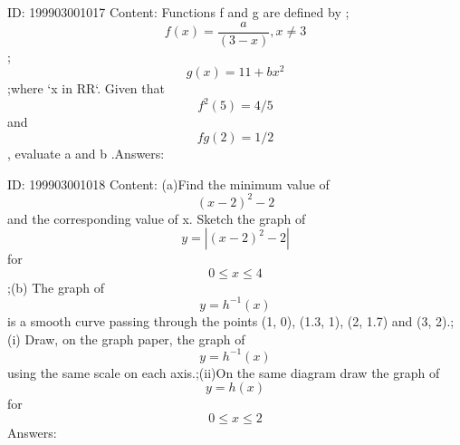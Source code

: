 \documentclass{article}
\begin{document}
ID: 199903001017
Content:
Functions f and g are defined by ;$$f(x)=\frac{a}{(3-x)}, x\neq3$$;$$g(x) = 11+bx^2$$;where `x in RR`. Given that $$f^2(5)=4/5$$ and $$fg(2)=1/2$$, evaluate a and b .Answers:

ID: 199903001018
Content:
(a)Find the minimum value of \[(x-2)^2-2\] and the corresponding value of x. Sketch the graph of \[y=|(x-2)^2-2|\] for \[0\leq x\leq 4\];(b) The graph of \[y=h^{-1}(x)\] is a smooth curve passing through the points (1, 0), (1.3, 1), (2, 1.7) and (3, 2).;(i)	Draw, on the graph paper, the graph of \[y=h^{-1}(x)\]using the same scale on each axis.;(ii)On the same diagram draw the graph of \[y=h(x)\]for \[0\leq x\leq 2\]Answers:
\end{document}
